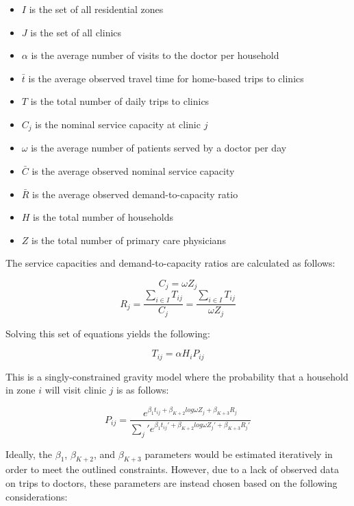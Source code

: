 \documentclass[]{elsarticle} %
\providecommand{\tightlist}{%
  \setlength{\itemsep}{0pt}\setlength{\parskip}{0pt}}
\begin{document}
\begin{itemize}
\tightlist
\item
  \(I\) is the set of all residential zones
\item
  \(J\) is the set of all clinics
\item
  \(\alpha\) is the average number of visits to the doctor per household
\item
  \(\bar{t}\) is the average observed travel time for home-based trips
  to clinics
\item
  \(T\) is the total number of daily trips to clinics
\item
  \(C_j\) is the nominal service capacity at clinic \(j\)
\item
  \(\omega\) is the average number of patients served by a doctor per
  day
\item
  \(\bar{C}\) is the average observed nominal service capacity
\item
  \(\bar{R}\) is the average observed demand-to-capacity ratio
\item
  \(H\) is the total number of households
\item
  \(Z\) is the total number of primary care physicians
\end{itemize}

The service capacities and demand-to-capacity ratios are calculated as
follows:

\[
C_j = \omega Z_j
\] \[
R_j = \frac{\sum_{i \in I} T_{ij}}{C_j} = \frac{\sum_{i \in I} T_{ij}}{\omega Z_j}
\]

Solving this set of equations yields the following:

\[
T_{ij} = \alpha H_i P_{ij}
\]

This is a singly-constrained gravity model where the probability that a
household in zone \(i\) will visit clinic \(j\) is as follows:

\[
P_{ij} = \frac{e^{\beta_1 t_{ij} + \beta_{K+2} log \omega Z_j + \beta_{K + 3} R_j}}{\sum_j\prime e^{\beta_1 t_{ij}\prime + \beta_{K+2} log \omega Z_j\prime + \beta_{K + 3} R_j\prime}}
\]

Ideally, the \(\beta_1\), \(\beta_{K+2}\), and \(\beta_{K + 3}\)
parameters would be estimated iteratively in order to meet the outlined
constraints. However, due to a lack of observed data on trips to
doctors, these parameters are instead chosen based on the following
considerations:
\end{document}
